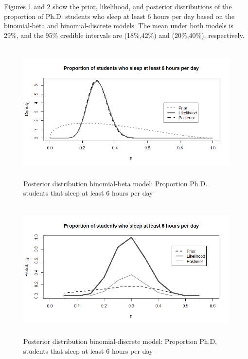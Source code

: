 \begin{enumerate}[leftmargin=*]
Figures \ref{fig16} and \ref{fig17} show the prior, likelihood, and posterior distributions of the proportion of Ph.D. students who sleep at least 6 hours per day based on the binomial-beta and binomial-discrete models. The mean under both models is 29\%, and the 95\% credible intervals are (18\%,42\%) and (20\%,40\%), respectively.
 
\begin{figure}[!h]
	\includegraphics[width=340pt, height=200pt]{Chapters/chapter4/figures/Sleep.png}
	\caption[List of figure caption goes here]{Posterior distribution binomial-beta model: Proportion Ph.D. students that sleep at least 6 hours per day}\label{fig16}
\end{figure}

\begin{figure}[!h]
	\includegraphics[width=340pt, height=200pt]{Chapters/chapter4/figures/sleepExp.png}
	\caption[List of figure caption goes here]{Posterior distribution binomial-discrete model: Proportion Ph.D. students that sleep at least 6 hours per day}\label{fig17}
\end{figure}

    
\end{enumerate}



